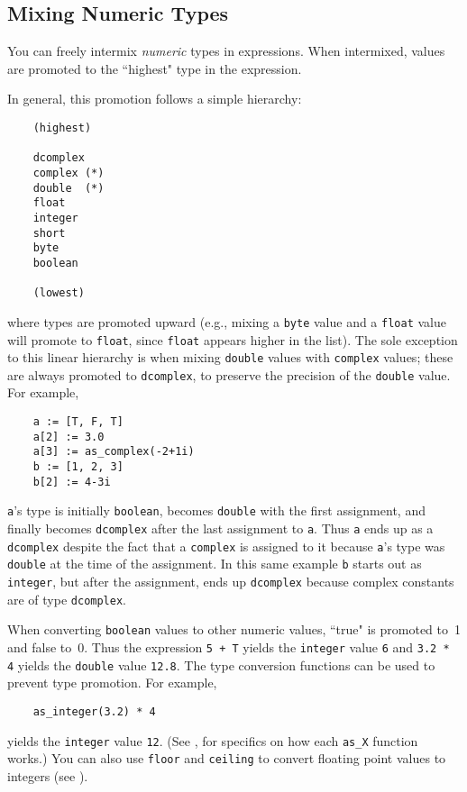 \subsection{Mixing Numeric Types}
\label{mixing-numerics}

You can freely intermix {\em numeric} types in expressions.  When intermixed,
values are promoted to the ``highest" type in the expression.

In general, this promotion follows a simple hierarchy:
\begin{verbatim}
    (highest)

    dcomplex
    complex (*)
    double  (*)
    float
    integer
    short
    byte
    boolean

    (lowest)
\end{verbatim}
where types are promoted upward (e.g., mixing a {\tt byte} value and
a {\tt float} value will promote to {\tt float}, since {\tt float} appears
higher in the list).  The sole exception to this linear hierarchy is when
mixing {\tt double} values with {\tt complex} values; these are always
promoted to {\tt dcomplex}, to preserve the precision of the {\tt double}
value.  For example,
\begin{verbatim}
    a := [T, F, T]
    a[2] := 3.0
    a[3] := as_complex(-2+1i)
    b := [1, 2, 3]
    b[2] := 4-3i
\end{verbatim}
{\tt a}'s type is initially {\tt boolean}, becomes {\tt double} with the
first assignment, and finally becomes {\tt dcomplex} after the last
assignment to {\tt a}. Thus {\tt a} ends up as a {\tt dcomplex} despite the fact
that a {\tt complex} is assigned to it because {\tt a}'s type was {\tt double}
at the time of the assignment.  In this same example {\tt b} starts out as {\tt integer},
but after the assignment, ends up {\tt dcomplex} because complex
constants are of type {\tt dcomplex}.

When converting {\tt boolean}
values to other numeric values,
``true" is promoted to~1 and false to~0.  Thus
the expression \verb-5 + T- yields the {\tt integer} value {\tt 6} and
\verb+3.2 * 4+ yields the {\tt double} value {\tt 12.8}.  The type
conversion functions can be used to prevent type promotion.  For example,
\begin{verbatim}
    as_integer(3.2) * 4
\end{verbatim}
yields the {\tt integer} value {\tt 12}.  (See
, for specifics on how each {\tt as\_X}
function works.) You can also use {\tt floor} and {\tt ceiling} to convert
floating point values to integers (see ).

